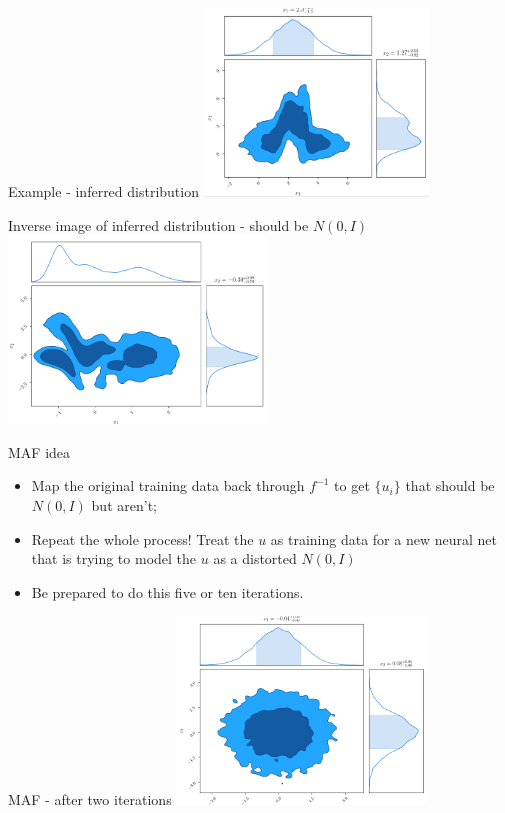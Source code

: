 \documentclass[usenames,dvipsnames]{beamer}
\begin{document}
\begin{frame}{Example - inferred distribution}
     \centering
     \includegraphics[height=5cm]{image_08}
\end{frame}

\begin{frame}{Inverse image of inferred distribution - should be $N(0, I)$}
     \centering
     \includegraphics[height=5cm]{image_09}
\end{frame}

\begin{frame}{MAF idea}
    \begin{itemize}
      \item{Map the original training data back through $f^{-1}$ to get $\{u_i\}$ that should be $N(0, I)$ but aren't;}
      \item{Repeat the whole process! Treat the $u$ as training data for a new neural net that is trying to model the $u$ as a distorted $N(0, I)$}
      \item{Be prepared to do this five or ten iterations.}
    \end{itemize}
\end{frame}

\begin{frame}{MAF - after two iterations}
     \centering
     \includegraphics[height=5cm]{image_10}
\end{frame}
\end{document}
